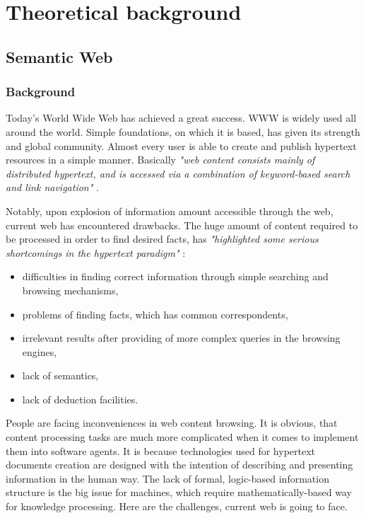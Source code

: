 \chapter{Theoretical background}
\label{cha:theoreticalBackground}

\section{Semantic Web}
\label{sec:semanticWeb}

\subsection{Background}
\label{sub:semWebBackground}

Today's World Wide Web has achieved a great success. WWW is widely used all around the world. Simple foundations, on which it is based, has given its strength and global community. Almost every user is able to create and publish hypertext resources in a simple manner. Basically \textit{"web content consists mainly of distributed hypertext, and is accessed via a combination of keyword-based search and link navigation"} \cite{HorSSF}.

Notably, upon explosion of information amount accessible through the web, current web has encountered drawbacks. The huge amount of content required to be processed in order to find desired facts, has \textit{"highlighted some serious shortcomings in the hypertext paradigm"} \cite{HorSSF}:
\begin{itemize}
    \setlength{\itemsep}{0cm}
    \setlength{\parskip}{0cm}

    \item difficulties in finding correct information through simple searching and browsing mechanisms,
    \item problems of finding facts, which has common correspondents,
    \item irrelevant results after providing of more complex queries in the browsing engines,
    \item lack of semantics,
    \item lack of deduction facilities.
\end{itemize}

\noindent People are facing inconveniences in web content browsing. It is obvious, that content processing tasks are much more complicated when it comes to implement them into software agents. It is because technologies used for hypertext documents creation are designed with the intention of describing and presenting information in the human way. The lack of formal, logic-based information structure is the big issue for machines, which require mathematically-based way for knowledge processing. Here are the challenges, current web is going to face.

